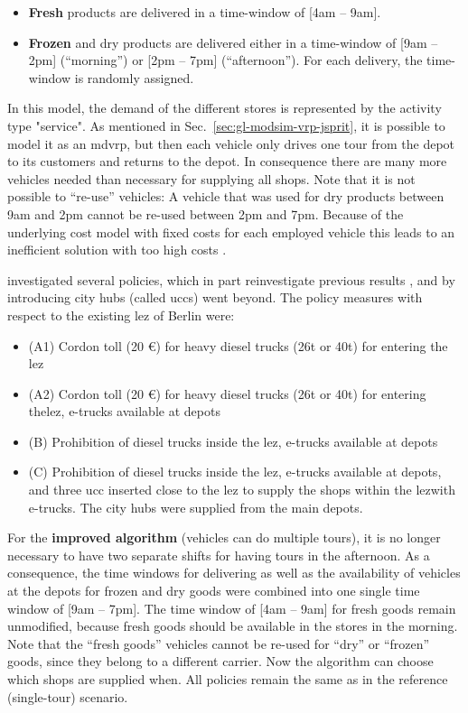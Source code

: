 \begin{itemize}[]
\item \textbf{Fresh} products are delivered in a time-window of [4am -- 9am].
\item \textbf{Frozen} and {dry} products are delivered either in a time-window of [9am -- 2pm] (``morning'') or [2pm -- 7pm] (``afternoon'').  For each delivery, the time-window is randomly assigned.
\end{itemize}

In this model, the demand of the different stores is represented by the activity type "service". As mentioned in Sec.~\ref{sec:gl-modsim-vrp-jsprit}, it is possible to model it as an \gls{mdvrp}, but  then each vehicle only drives one tour from the depot to its customers and returns to the depot. 
In consequence there are many more vehicles needed than necessary for supplying all shops.
Note that it is not possible to ``re-use'' vehicles: A vehicle that was used for dry products between 9am and 2pm cannot be re-used between 2pm and 7pm.
Because of the underlying cost model with fixed costs for each employed vehicle this leads to an inefficient solution with too high costs \citep{MartinsTurnerNagel2019FreightMultipleToursABMTrans}.

\citet{MartinsTurnerNagel2019FreightMultipleToursABMTrans} investigated several policies, which in part reinvestigate previous results \citep{SchroederLiedtke2014FoodDistributionBerlin}, and by introducing city hubs (called \Glspl{ucc}) went beyond. 
The policy measures with respect to the existing \acrfull{lez} of Berlin were:

\begin{itemize}
\item (A1) Cordon toll (20 \euro{}) for heavy diesel trucks (26t or 40t) for entering the \gls{lez}
\item (A2) Cordon toll (20 \euro{}) for heavy diesel trucks (26t or 40t) for entering the\gls{lez}, e-trucks available at depots
\item (B) Prohibition of diesel trucks inside the \gls{lez}, e-trucks available at depots
\item (C) Prohibition of diesel trucks inside the \gls{lez}, e-trucks available at depots, and three \gls{ucc} inserted close to the \gls{lez} to supply the shops within the \gls{lez}with e-trucks. The city hubs were supplied from the main depots.
\end{itemize}


For the \textbf{improved algorithm} (vehicles can do multiple tours), it is no longer necessary to have two separate shifts for having tours in the afternoon. As a consequence, the time windows for delivering as well as the availability of vehicles at the depots for frozen and dry goods were combined into one single time window of [9am -- 7pm]. The time window of [4am -- 9am] for fresh goods remain unmodified, because fresh goods should be available in the stores in the morning. Note that the ``fresh goods'' vehicles cannot be re-used for ``dry'' or ``frozen'' goods, since they belong to a different carrier. Now the algorithm can choose which shops are supplied when. All policies remain the same as in the reference (single-tour) scenario. 

